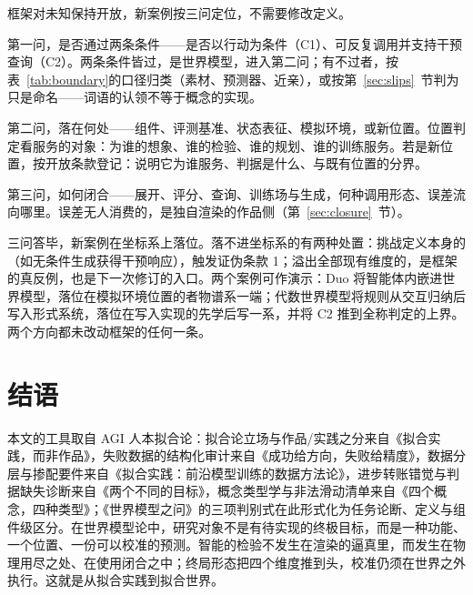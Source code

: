 \documentclass[10pt,fontset=fandol]{ctexart}
\begin{document}
框架对未知保持开放，新案例按三问定位，不需要修改定义。

第一问，是否通过两条条件——是否以行动为条件（C1）、可反复调用并支持干预查询（C2）。两条条件皆过，是世界模型，进入第二问；有不过者，按表~\ref{tab:boundary}的口径归类（素材、预测器、近亲），或按第~\ref{sec:slips}~节判为只是命名——词语的认领不等于概念的实现。

第二问，落在何处——组件、评测基准、状态表征、模拟环境，或新位置。位置判定看服务的对象：为谁的想象、谁的检验、谁的规划、谁的训练服务。若是新位置，按开放条款登记：说明它为谁服务、判据是什么、与既有位置的分界。

第三问，如何闭合——展开、评分、查询、训练场与生成，何种调用形态、误差流向哪里。误差无人消费的，是独自渲染的作品侧（第~\ref{sec:closure}~节）。

三问答毕，新案例在坐标系上落位。落不进坐标系的有两种处置：挑战定义本身的（如无条件生成获得干预响应），触发证伪条款 1；溢出全部现有维度的，是框架的真反例，也是下一次修订的入口。两个案例可作演示：Duo 将智能体内嵌进世界模型，落位在模拟环境位置的者物谱系一端\cite{duo2026}；代数世界模型将规则从交互归纳后写入形式系统，落位在写入实现的先学后写一系，并将 C2 推到全称判定的上界\cite{awm2026}。两个方向都未改动框架的任何一条。

\section*{结语}

本文的工具取自 AGI 人本拟合论：拟合论立场与作品/实践之分来自《拟合实践，而非作品》\cite{yu2026fitting}，失败数据的结构化审计来自《成功给方向，失败给精度》\cite{yu2026failure}，数据分层与掺配要件来自《拟合实践：前沿模型训练的数据方法论》\cite{yu2026methodology}，进步转账错觉与判据缺失诊断来自《两个不同的目标》\cite{yu2026twogoals}，概念类型学与非法滑动清单来自《四个概念，四种类型》\cite{yu2026fourconcepts}；《世界模型之问》\cite{yu2026worldmodelq}的三项判别式在此形式化为任务论断、定义与组件级区分。在世界模型论中，研究对象不是有待实现的终极目标，而是一种功能、一个位置、一份可以校准的预测。智能的检验不发生在渲染的逼真里，而发生在物理用尽之处、在使用闭合之中；终局形态把四个维度推到头，校准仍须在世界之外执行。这就是从拟合实践到拟合世界。
\end{document}
